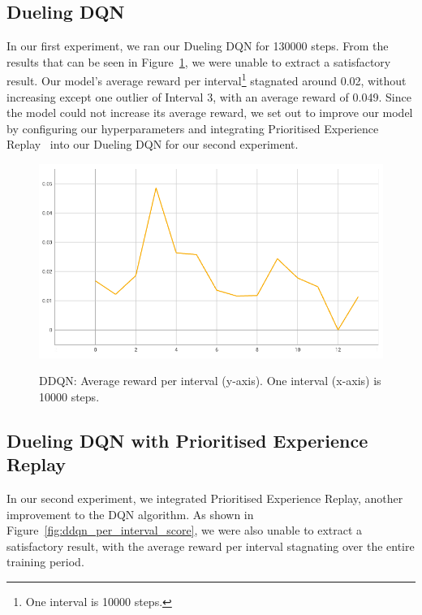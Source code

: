 \documentclass[12pt,a4paper]{article}
\begin{document}
    \subsection{Dueling DQN}\label{subsec:dueling-dqn}
    In our first experiment, we ran our Dueling DQN for 130000 steps.
    From the results that can be seen in Figure~\ref{fig:ddqn_interval_score}, we were unable to extract a satisfactory result.
    Our model's average reward per interval\footnote{One interval is 10000 steps.} stagnated around 0.02, without increasing except one outlier of Interval 3, with an average reward of 0.049.
    Since the model could not increase its average reward, we set out to improve our model by configuring our hyperparameters and integrating Prioritised Experience Replay~\citet{schaul16} into our Dueling DQN for our second experiment.
    \begin{figure}[H]
        \caption[DDQN: Average reward per interval.]{DDQN: Average reward per interval (y-axis). One interval (x-axis) is 10000 steps.}
        \centering
        \includegraphics[scale=0.5]{interval_score_ddqn}
        \label{fig:ddqn_interval_score}
    \end{figure}

    \subsection{Dueling DQN with Prioritised Experience Replay}\label{subsec:dueling-dqn-with-prioritised-experience-replay}
    In our second experiment, we integrated Prioritised Experience Replay, another improvement to the DQN algorithm.
    As shown in Figure~\ref{fig:ddqn_per_interval_score}, we were also unable to extract a satisfactory result, with the average reward per interval stagnating over the entire training period.
\end{document}
